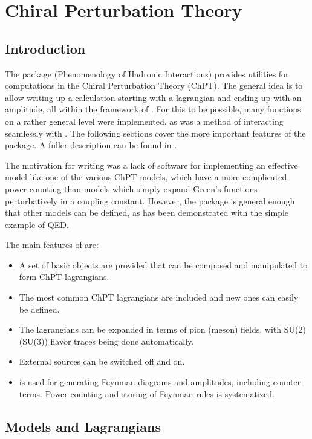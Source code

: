 \section{Chiral Perturbation Theory}

\subsection{Introduction}

The package \fphi (Phenomenology of Hadronic Interactions) provides utilities for computations in
the Chiral Perturbation Theory (ChPT).
The general idea is to allow writing up a calculation starting with a lagrangian and ending up
with an amplitude, all within the framework of \fc. For this to be possible, many functions on a
rather general level were implemented, as was a method of interacting seamlessly with \fa. The
following sections cover the more important features of the package. A fuller description can be
found in \cite{PHI}.

The motivation for writing \fphi was a lack of software for implementing an effective model like 
one of the various ChPT models, which have a more complicated power counting than models which 
simply expand Green's functions perturbatively in a coupling constant. However, the package is 
general enough that other models can be defined, as has been demonstrated with the simple example 
of QED.

The main features of \fphi are:
\begin{itemize}
\item A set of basic objects are provided that can be composed and manipulated to form ChPT
lagrangians.
\item The most common ChPT lagrangians are included and new ones can easily be defined.
\item The lagrangians can be expanded in terms of pion (meson) fields, with SU(2) (SU(3)) flavor
traces being done automatically.
\item External sources can be switched off and on.
\item \fa is used for generating Feynman diagrams and amplitudes, including counter-terms. Power
counting and storing of Feynman rules is systematized.
\end{itemize}

\subsection{Models and Lagrangians}

